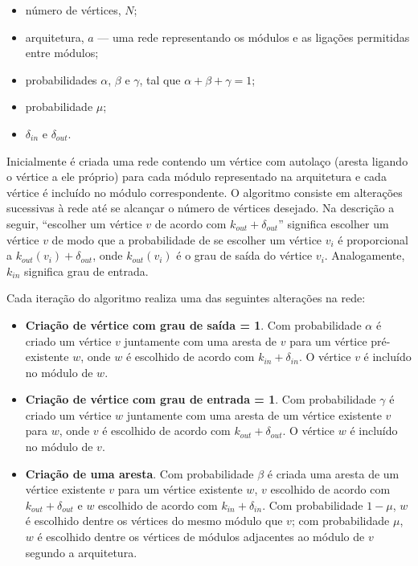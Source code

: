 \documentclass{acm_proc_article-sp}
\begin{document}
\begin{itemize}
  \item número de vértices, $N$;
  \item arquitetura, $a$ --- uma rede representando os módulos e as ligações permitidas entre módulos;
  \item probabilidades $\alpha$, $\beta$ e $\gamma$, tal que $\alpha + \beta + \gamma = 1$;
  \item probabilidade $\mu$;
  \item $\delta_{in}$ e $\delta_{out}$.
\end{itemize}

Inicialmente é criada uma rede contendo um vértice com autolaço (aresta ligando o vértice a ele próprio) para cada módulo representado na arquitetura e cada vértice é incluído no módulo correspondente. O algoritmo consiste em alterações sucessivas à rede até se alcançar o número de vértices desejado. Na descrição a seguir, ``escolher um vértice $v$ de acordo com $k_{out} + \delta_{out}$'' significa escolher um vértice $v$ de modo que a probabilidade de se escolher um vértice $v_i$ é proporcional a $k_{out}(v_i) + \delta_{out}$, onde $k_{out}(v_i)$ é o grau de saída do vértice $v_i$. Analogamente, $k_{in}$ significa grau de entrada.

Cada iteração do algoritmo realiza uma das seguintes alterações na rede:

\begin{itemize}
  \item \textbf{Criação de vértice com grau de saída = 1}. Com probabilidade $\alpha$ é criado um vértice $v$ juntamente com uma aresta de $v$ para um vértice pré-existente $w$, onde $w$ é escolhido de acordo com $k_{in} + \delta_{in}$. O vértice $v$ é incluído no módulo de $w$.
  \item \textbf{Criação de vértice com grau de entrada = 1}. Com probabilidade $\gamma$ é criado um vértice $w$ juntamente com uma aresta de um vértice existente $v$ para $w$, onde $v$ é escolhido de acordo com $k_{out} + \delta_{out}$. O vértice $w$ é incluído no módulo de $v$.
  \item \textbf{Criação de uma aresta}. Com probabilidade $\beta$ é criada uma aresta de um vértice existente $v$ para um vértice existente $w$, $v$ escolhido de acordo com $k_{out} + \delta_{out}$ e $w$ escolhido de acordo com $k_{in} + \delta_{in}$. Com probabilidade $1 - \mu$, $w$ é escolhido dentre os vértices do mesmo módulo que $v$; com probabilidade $\mu$, $w$ é escolhido dentre os vértices de módulos adjacentes ao módulo de $v$ segundo a arquitetura. 
\end{itemize}
\end{document}
